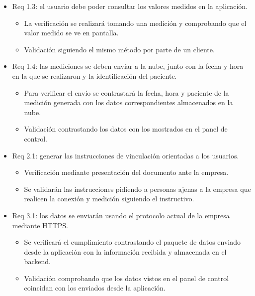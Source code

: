 \documentclass[
11pt, %
]{charter}
\begin{document}
\begin{itemize}
\item Req 1.3: el usuario debe poder consultar los valores medidos en la aplicación.

\begin{itemize}
	\item La verificación se realizará tomando una medición y comprobando que el valor medido se ve en pantalla.
	\item Validación siguiendo el mismo método por parte de un cliente.
\end{itemize}

\end{itemize}

\begin{itemize}
\item Req 1.4: las mediciones se deben enviar a la nube, junto con la fecha y hora en la que se realizaron y la identificación del paciente.

\begin{itemize}
	\item Para verificar el envío se contrastará la fecha, hora y paciente de la medición generada con los datos correspondientes almacenados en la nube.
	\item Validación contrastando los datos con los mostrados en el panel de control.
\end{itemize}

\end{itemize}

\begin{itemize}
\item Req 2.1: generar las instrucciones de vinculación orientadas a los usuarios.

\begin{itemize}
	\item Verificación mediante presentación del documento ante la empresa.
	\item Se validarán las instrucciones pidiendo a personas ajenas a la empresa que realicen la conexión y medición siguiendo el instructivo.
\end{itemize}

\end{itemize}

\begin{itemize}
\item Req 3.1: los datos se enviarán usando el protocolo actual de la empresa mediante HTTPS.

\begin{itemize}
	\item Se verificará el cumplimiento contrastando el paquete de datos enviado desde la aplicación con la información recibida y almacenada en el backend.
	\item Validación comprobando que los datos vistos en el panel de control coincidan con los enviados desde la aplicación.
\end{itemize}

\end{itemize}
\end{document}
